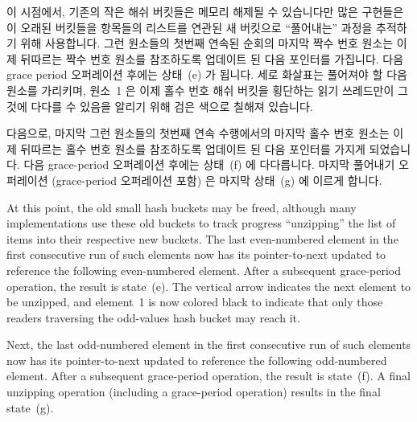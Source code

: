 이 시점에서, 기존의 작은 해쉬 버킷들은 메모리 해제될 수 있습니다만 많은
구현들은 이 오래된 버킷들을 항목들의 리스트를 연관된 새 버킷으로 ``풀어내는''
과정을 추적하기 위해 사용합니다.
그런 원소들의 첫번째 연속된 순회의 마지막 짝수 번호 원소는 이제 뒤따르는 짝수
번호 원소를 참조하도록 업데이트 된 다음 포인터를 가집니다.
다음 grace period 오퍼레이션 후에는 상태~(e) 가 됩니다.
세로 화살표는 풀어져야 할 다음 원소를 가리키며, 원소~1 은 이제 홀수 번호 해쉬
버킷을 횡단하는 읽기 쓰레드만이 그것에 다다를 수 있음을 알리기 위해 검은 색으로
칠해져 있습니다.

다음으로, 마지막 그런 원소들의 첫번째 연속 수행에서의 마지막 홀수 번호 원소는
이제 뒤따르는 홀수 번호 원소를 참조하도록 업데이트 된 다음 포인터를 가지게
되었습니다.
다음 grace-period 오퍼레이션 후에는 상태~(f) 에 다다릅니다.
마지막 풀어내기 오퍼레이션 (grace-period 오퍼레이션 포함) 은 마지막 상태~(g) 에
이르게 합니다.

\iffalse

At this point, the old small hash buckets may be freed, although many
implementations use these old buckets to track progress ``unzipping''
the list of items into their respective new buckets.
The last even-numbered element in the first consecutive run of such
elements now has its pointer-to-next updated to reference the following
even-numbered element.
After a subsequent grace-period operation, the result is state~(e).
The vertical arrow indicates the next element to be unzipped, and
element~1 is now colored black to indicate that only those readers traversing
the odd-values hash bucket may reach it.

Next, the last odd-numbered element in the first consecutive run of such
elements now has its pointer-to-next updated to reference the following
odd-numbered element.
After a subsequent grace-period operation, the result is state~(f).
A final unzipping operation (including a grace-period operation)
results in the final state~(g).

